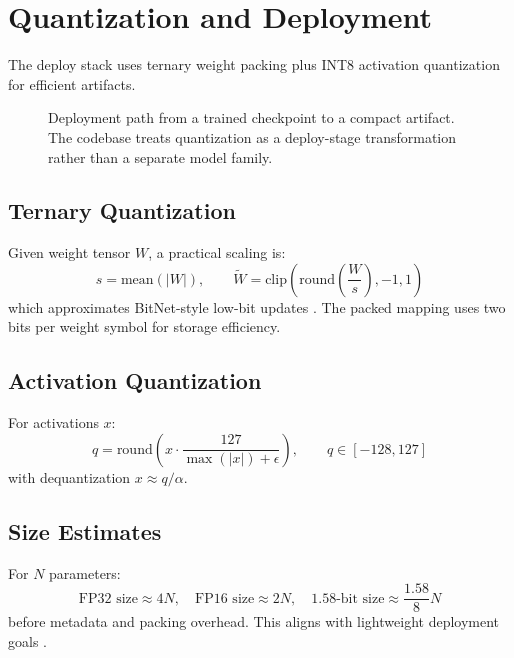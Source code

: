 \section{Quantization and Deployment}
\label{sec:quantization}

The deploy stack uses ternary weight packing plus INT8 activation quantization for efficient artifacts.

\begin{figure}[t]
\centering
{}
\caption{Deployment path from a trained checkpoint to a compact artifact. The codebase treats quantization as a deploy-stage transformation rather than a separate model family.}
\label{fig:deploy-flow}
\end{figure}

\subsection{Ternary Quantization}
Given weight tensor $W$, a practical scaling is:
\[
s=\text{mean}(|W|),\qquad
\tilde{W}=\text{clip}\left(\text{round}\left(\frac{W}{s}\right),-1,1\right)
\]
which approximates BitNet-style low-bit updates \citep{wang_bitnet_2023}. The packed mapping uses two bits per weight symbol for storage efficiency.

\subsection{Activation Quantization}
For activations $x$:
\[
q=\text{round}\left(x\cdot\frac{127}{\max(|x|)+\epsilon}\right),\qquad q\in[-128,127]
\]
with dequantization $x\approx q/\alpha$.

\subsection{Size Estimates}
For $N$ parameters:
\[
\text{FP32 size}\approx 4N,\quad \text{FP16 size}\approx 2N,\quad \text{1.58-bit size}\approx \frac{1.58}{8}N
\]
before metadata and packing overhead. This aligns with lightweight deployment goals \citep{samson_lightweight_2026,bravin_embbert_2026}.

